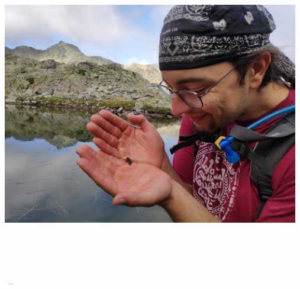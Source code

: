 \documentclass[ twoside,openright,titlepage,numbers=noenddot,%
headinclude,footinclude,cleardoublepage=empty,abstract=on,
BCOR=5mm,paper=b5,fontsize=11pt, dvipsnames
]{scrreprt}
\begin{document}
\frenchspacing
\raggedbottom
{} %
\pagestyle{plain}

\thispagestyle{empty}
\begin{center}
    \spacedlowsmallcaps{\myName} \\ \medskip

    \begingroup
    \color{CTtitle}\spacedallcaps{\myTitle}\\ \bigskip
    \mySubtitle \\ \medskip
    \endgroup
\end{center}

\begin{titlepage}
    \begin{addmargin}[-1cm]{-3cm}
    \begin{center}
        \large

        \hfill

        \vfill

        \begingroup
        \color{CTtitle}\spacedallcaps{\myTitle} \\ \bigskip
        \mySubtitle \\ \medskip
        \endgroup

        \spacedlowsmallcaps{\myName}

        \vfill

        \includegraphics[width=13cm]{gfx/froggy} \\ \medskip

        \myDepartment \\
        \myFaculty \\
        \myUni \\ \bigskip

        \myTime\ -- \myVersion

        \vfill

    \end{center}
  \end{addmargin}
\end{titlepage}
\end{document}
